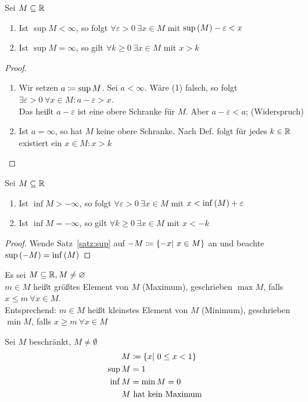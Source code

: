 \begin{satz}
    \label{satz:sup}
    Sei $M\subseteq \mathbb{R}$
    \begin{enumerate}[label=(\arabic*)]
        \item Ist $\sup M < \infty$, so folgt $\forall \varepsilon > 0~\exists x\in M$ mit $\sup\left(M\right) -\varepsilon < x$
        \item Ist $\sup M = \infty$, so gilt $\forall k\geq 0~\exists x\in M$ mit $x> k$
    \end{enumerate}
    \begin{proof}
        \theoremescape
        \begin{enumerate}
            \item Wir setzen $a\coloneqq \sup M$. Sei $a<\infty$. Wäre (1) falsch, so folgt $\exists \varepsilon>0~\forall x\in M:a-\varepsilon > x$.\\Das heißt $a-\varepsilon$ ist eine obere Schranke für $M$. Aber $a-\varepsilon < a$; (Widerspruch)
            \item Ist $a=\infty$, so hat $M$ keine obere Schranke. Nach Def. folgt für jedes $k\in\mathbb{R}$ existiert ein $x\in M: x > k$\qedhere
        \end{enumerate}
    \end{proof}
\end{satz}
\begin{satz}
    \label{satz:inf}
    Sei $M\subseteq \mathbb{R}$
    \begin{enumerate}
        \item Ist $\inf M > -\infty$, so folgt $\forall \varepsilon > 0~\exists x\in M$ mit $x < \inf\left(M\right)+ \varepsilon$
        \item Ist $\inf M = -\infty$, so gilt $\forall k\geq 0~\exists x\in M$ mit $x< -k$
    \end{enumerate}
    \begin{proof}
        Wende Satz~\ref{satz:sup} auf $-M\coloneqq\left\{-x|~x\in M\right\}$ an und beachte $\sup\left(-M\right) = \inf\left(M\right)$
    \end{proof}
\end{satz}
\begin{definition}
    Es sei $M\subseteq \mathbb{R}, M\neq\varnothing$\\
    $m\in M$ heißt größtes Element von $M$ (Maximum), geschrieben $\max M$, falls $x\leq m~\forall x\in M$.\\
    Entsprechend: $m\in M$ heißt kleinstes Element von $M$ (Minimum), geschrieben $\min M$, falls $x\geq m~\forall x\in M$
\end{definition}

\begin{beispiel}
    Sei $M$ beschränkt, $M\neq\emptyset$
    \begin{align*}
        M&\coloneqq\left\{x|~0\leq x< 1\right\}\\
        \sup M &= 1\\
        \inf M &= \min M = 0\\
        M&\text{ hat kein Maximum}
    \end{align*}
\end{beispiel}

\newpage